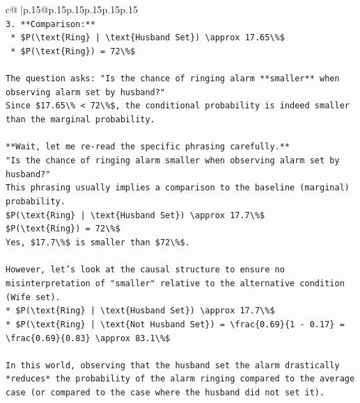 \documentclass{article}
\begin{document}
{\begin{supertabular}{c@{$\;$}|p{.15\linewidth}@{}p{.15\linewidth}p{.15\linewidth}p{.15\linewidth}p{.15\linewidth}p{.15\linewidth}}
{{{\\ 
\texttt{3.  **Comparison:**} \\
\texttt{    *   \$P(\textbackslash{}text\{Ring\} | \textbackslash{}text\{Husband Set\}) \textbackslash{}approx 17.65\textbackslash{}\%\$} \\
\texttt{    *   \$P(\textbackslash{}text\{Ring\}) = 72\textbackslash{}\%\$} \\
\\ 
\texttt{The question asks: "Is the chance of ringing alarm **smaller** when observing alarm set by husband?"} \\
\texttt{Since \$17.65\textbackslash{}\% < 72\textbackslash{}\%\$, the conditional probability is indeed smaller than the marginal probability.} \\
\\ 
\texttt{**Wait, let me re{-}read the specific phrasing carefully.**} \\
\texttt{"Is the chance of ringing alarm smaller when observing alarm set by husband?"} \\
\texttt{This phrasing usually implies a comparison to the baseline (marginal) probability.} \\
\texttt{\$P(\textbackslash{}text\{Ring\} | \textbackslash{}text\{Husband Set\}) \textbackslash{}approx 17.7\textbackslash{}\%\$} \\
\texttt{\$P(\textbackslash{}text\{Ring\}) = 72\textbackslash{}\%\$} \\
\texttt{Yes, \$17.7\textbackslash{}\%\$ is smaller than \$72\textbackslash{}\%\$.} \\
\\ 
\texttt{However, let's look at the causal structure to ensure no misinterpretation of "smaller" relative to the alternative condition (Wife set).} \\
\texttt{*   \$P(\textbackslash{}text\{Ring\} | \textbackslash{}text\{Husband Set\}) \textbackslash{}approx 17.7\textbackslash{}\%\$} \\
\texttt{*   \$P(\textbackslash{}text\{Ring\} | \textbackslash{}text\{Not Husband Set\}) = \textbackslash{}frac\{0.69\}\{1 {-} 0.17\} = \textbackslash{}frac\{0.69\}\{0.83\} \textbackslash{}approx 83.1\textbackslash{}\%\$} \\
\\ 
\texttt{In this world, observing that the husband set the alarm drastically *reduces* the probability of the alarm ringing compared to the average case (or compared to the case where the husband did not set it).} \\
}}}
\end{supertabular}}
\end{document}
